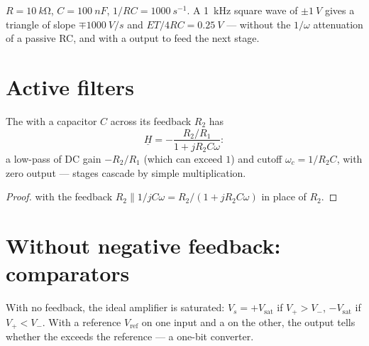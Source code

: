\begin{example}\label{ex:b1:operational-amplifier:triangle}
$R = \qty{10}{k\ohm}$, $C = \qty{100}{nF}$, $1/RC = \qty{1000}{s^{-1}}$.
A \qty{1}{kHz} square wave of $\pm\qty{1}{V}$ gives a triangle of slope
$\mp\qty{1000}{V/s}$ and  $ET/4RC = \qty{0.25}{V}$ --- without
the $1/\omega$ attenuation of a passive RC, and with a 
output to feed the next stage.
\end{example}

\section{Active filters}

\begin{proposition}\label{prop:b1:operational-amplifier:activelp}
The  with a capacitor $C$ across its feedback
 $R_2$ has
\[
\underline H = -\frac{R_2/R_1}{1 + jR_2C\omega}:
\]
a low-pass of DC gain $-R_2/R_1$ (which can exceed $1$) and cutoff
$\omega_c = 1/R_2C$, with zero output  --- stages cascade by
simple multiplication.
\end{proposition}

\begin{proof}
 with the feedback  $R_2 \parallel 1/jC\omega
= R_2/(1 + jR_2C\omega)$ in place of $R_2$.
\end{proof}

\section{Without negative feedback: comparators}

\begin{proposition}[Comparator]\label{prop:b1:operational-amplifier:comparator}
With no feedback, the ideal amplifier is saturated:
$V_s = +V_{\mathrm{sat}}$ if $V_+ > V_-$, $-V_{\mathrm{sat}}$ if
$V_+ < V_-$. With a reference $V_{\mathrm{ref}}$ on one input and a
 on the other, the output tells whether the  exceeds the
reference --- a one-bit converter.
\end{proposition}

